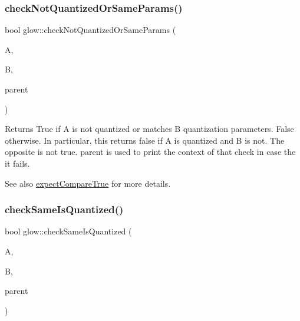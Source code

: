 \subsubsection{\texorpdfstring{check\+Not\+Quantized\+Or\+Same\+Params()}{checkNotQuantizedOrSameParams()}\hspace{0.1cm}{\footnotesize\ttfamily [2/2]}}
{\footnotesize\ttfamily bool glow\+::check\+Not\+Quantized\+Or\+Same\+Params (\begin{DoxyParamCaption}\item[{const \hyperlink{structglow_1_1_type}{Type\+Ref}}]{A,  }\item[{const \hyperlink{structglow_1_1_type}{Type\+Ref}}]{B,  }\item[{const \hyperlink{classglow_1_1_node}{Node} $\ast$}]{parent }\end{DoxyParamCaption})}

\begin{DoxyReturn}{Returns}
True if {\ttfamily A} is not quantized or matches {\ttfamily B} quantization parameters. False otherwise. In particular, this returns false if {\ttfamily A} is quantized and {\ttfamily B} is not. The opposite is not true. {\ttfamily parent} is used to print the context of that check in case the it fails. 
\end{DoxyReturn}
\begin{DoxySeeAlso}{See also}
\hyperlink{namespaceglow_afd8e77c649bf3668467058ae071bb875}{expect\+Compare\+True} for more details. 
\end{DoxySeeAlso}
\mbox{\label{namespaceglow_a9d3dd221c6d43bfa4d2e54ff8640604b}} 
\subsubsection{\texorpdfstring{check\+Same\+Is\+Quantized()}{checkSameIsQuantized()}}
{\footnotesize\ttfamily bool glow\+::check\+Same\+Is\+Quantized (\begin{DoxyParamCaption}\item[{const \hyperlink{structglow_1_1_type}{Type\+Ref}}]{A,  }\item[{const \hyperlink{structglow_1_1_type}{Type\+Ref}}]{B,  }\item[{const \hyperlink{classglow_1_1_node}{Node} $\ast$}]{parent }\end{DoxyParamCaption})}

